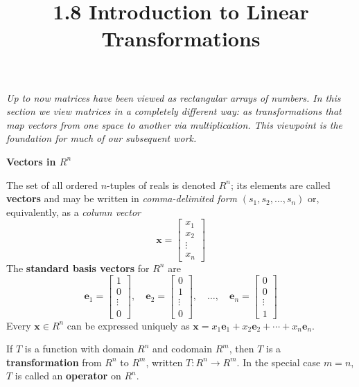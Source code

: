 \documentclass{article}
\title{1.8 Introduction to Linear Transformations}
\date{}
\author{}
\newcommand{\redheading}[1]{{\vspace{2mm}\noindent\Large\bfseries\color{red!55!black} #1\par}\vspace{2mm}}
\theoremstyle{mystyle}
\begin{document}
\maketitle

{\itshape\color{blue!45!black}
Up to now matrices have been viewed as rectangular arrays of numbers. In this section we view matrices in a completely different way: as \emph{transformations} that map vectors from one space to another via multiplication. This viewpoint is the foundation for much of our subsequent work.\par}

\redheading{Vectors in $R^n$}

The set of all ordered $n$-tuples of reals is denoted $R^n$; its elements are called \textbf{vectors} and may be written in \emph{comma-delimited form} $(s_1,s_2,\ldots,s_n)$ or, equivalently, as a \emph{column vector}
\[
\mathbf{x}=\begin{bmatrix}x_1\\x_2\\\vdots\\x_n\end{bmatrix}
\]
The \textbf{standard basis vectors} for $R^n$ are
\[
\mathbf{e}_1=\begin{bmatrix}1\\0\\\vdots\\0\end{bmatrix},\quad
\mathbf{e}_2=\begin{bmatrix}0\\1\\\vdots\\0\end{bmatrix},\quad\ldots,\quad
\mathbf{e}_n=\begin{bmatrix}0\\0\\\vdots\\1\end{bmatrix}
\]
Every $\mathbf{x}\in R^n$ can be expressed uniquely as $\mathbf{x}=x_1\mathbf{e}_1+x_2\mathbf{e}_2+\cdots+x_n\mathbf{e}_n$.

\begin{tcolorbox}[colback=teal!4, colframe=teal!65!black, title=Definition 1, fonttitle=\bfseries, boxrule=0.5mm, arc=3mm]
If $T$ is a function with domain $R^n$ and codomain $R^m$, then $T$ is a \textbf{transformation} from $R^n$ to $R^m$, written $T:R^n\to R^m$. In the special case $m=n$, $T$ is called an \textbf{operator} on $R^n$.
\end{tcolorbox}
\end{document}
